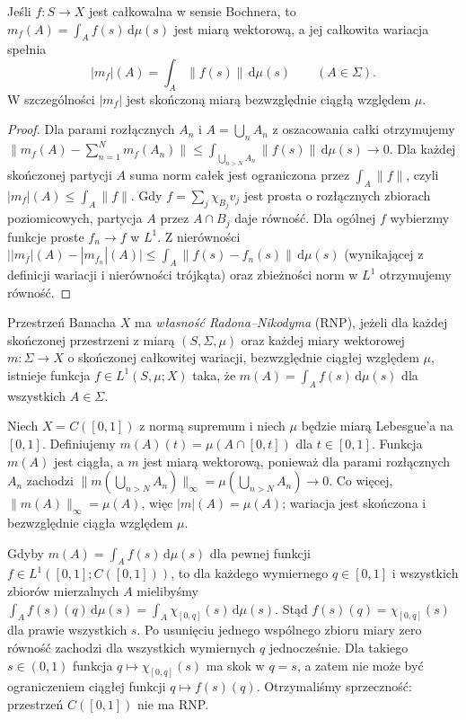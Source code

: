\begin{twierdzenie}
\label{thm:bochner-measure15b}
Jeśli $f:S\to X$ jest całkowalna w sensie Bochnera, to
$m_f(A)=\int_Af(s)\,\mathrm d\mu(s)$ jest miarą wektorową,
a jej całkowita wariacja spełnia
\[
 |m_f|(A)=\int_A\|f(s)\|\,\mathrm d\mu(s)
 \qquad(A\in\Sigma).
\]
W szczególności $|m_f|$ jest skończoną miarą bezwzględnie
ciągłą względem $\mu$.
\end{twierdzenie}
\begin{proof}
Dla parami rozłącznych $A_n$ i $A=\bigcup_nA_n$
z oszacowania całki otrzymujemy
$\|m_f(A)-\sum_{n=1}^Nm_f(A_n)\|
\le\int_{\bigcup_{n>N}A_n}\|f(s)\|\,\mathrm d\mu(s)\to0$.
Dla każdej skończonej partycji $A$ suma norm całek
jest ograniczona przez $\int_A\|f\|$, czyli
$|m_f|(A)\le\int_A\|f\|$.
Gdy $f=\sum_j\chi_{B_j}v_j$ jest prosta o rozłącznych
zbiorach poziomicowych, partycja $A$ przez $A\cap B_j$
daje równość. Dla ogólnej $f$ wybierzmy funkcje proste
$f_n\to f$ w $L^1$. Z nierówności
$\bigl||m_f|(A)-|m_{f_n}|(A)\bigr|
\le\int_A\|f(s)-f_n(s)\|\,\mathrm d\mu(s)$
(wynikającej z definicji wariacji i nierówności trójkąta)
oraz zbieżności norm w $L^1$ otrzymujemy równość.
\end{proof}

\begin{definicja}
\label{def:rnp15b}
Przestrzeń Banacha $X$ ma \emph{własność Radona--Nikodyma}
(RNP), jeżeli dla każdej skończonej przestrzeni z miarą
$(S,\Sigma,\mu)$ oraz każdej miary wektorowej
$m:\Sigma\to X$ o skończonej całkowitej wariacji,
bezwzględnie ciągłej względem $\mu$, istnieje funkcja
$f\in L^1(S,\mu;X)$ taka, że
$m(A)=\int_Af(s)\,\mathrm d\mu(s)$ dla wszystkich $A\in\Sigma$.
\end{definicja}

\begin{przyklad}
\label{ex:rnp-counterexample15b}
Niech $X=C([0,1])$ z normą supremum i niech $\mu$ będzie
miarą Lebesgue'a na $[0,1]$. Definiujemy
$m(A)(t)=\mu(A\cap[0,t])$ dla $t\in[0,1]$.
Funkcja $m(A)$ jest ciągła, a $m$ jest miarą wektorową,
ponieważ dla parami rozłącznych $A_n$ zachodzi
$\|m(\bigcup_{n>N}A_n)\|_\infty
=\mu(\bigcup_{n>N}A_n)\to0$.
Co więcej, $\|m(A)\|_\infty=\mu(A)$, więc
$|m|(A)=\mu(A)$; wariacja jest skończona i
bezwzględnie ciągła względem $\mu$.

Gdyby $m(A)=\int_Af(s)\,\mathrm d\mu(s)$ dla pewnej funkcji
$f\in L^1([0,1];C([0,1]))$, to dla każdego wymiernego
$q\in[0,1]$ i wszystkich zbiorów mierzalnych $A$
mielibyśmy
$\int_A f(s)(q)\,\mathrm d\mu(s)
=\int_A\chi_{[0,q]}(s)\,\mathrm d\mu(s)$.
Stąd $f(s)(q)=\chi_{[0,q]}(s)$ dla prawie wszystkich $s$.
Po usunięciu jednego wspólnego zbioru miary zero równość
zachodzi dla wszystkich wymiernych $q$ jednocześnie.
Dla takiego $s\in(0,1)$ funkcja
$q\mapsto\chi_{[0,q]}(s)$ ma skok w $q=s$, a zatem
nie może być ograniczeniem ciągłej funkcji $q\mapsto f(s)(q)$.
Otrzymaliśmy sprzeczność: przestrzeń $C([0,1])$ nie ma RNP.
\end{przyklad}

